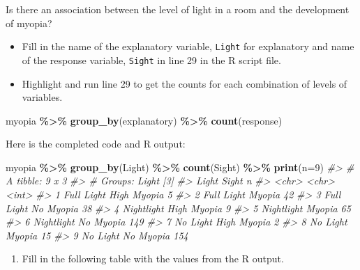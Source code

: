 \documentclass[
]{report}
\newenvironment{Shaded}{\begin{snugshade}}{\end{snugshade}}
\newcommand{\AttributeTok}[1]{\textcolor[rgb]{0.13,0.29,0.53}{#1}}
\newcommand{\CommentTok}[1]{\textcolor[rgb]{0.56,0.35,0.01}{\textit{#1}}}
\newcommand{\DecValTok}[1]{\textcolor[rgb]{0.00,0.00,0.81}{#1}}
\newcommand{\FunctionTok}[1]{\textcolor[rgb]{0.13,0.29,0.53}{\textbf{#1}}}
\newcommand{\NormalTok}[1]{#1}
\newcommand{\SpecialCharTok}[1]{\textcolor[rgb]{0.81,0.36,0.00}{\textbf{#1}}}
\providecommand{\tightlist}{%
  \setlength{\itemsep}{0pt}\setlength{\parskip}{0pt}}
\begin{document}
Is there an association between the level of light in a room and the development of myopia?

\begin{itemize}
\item
  Fill in the name of the explanatory variable, \texttt{Light} for explanatory and name of the response variable, \texttt{Sight} in line 29 in the R script file.
\item
  Highlight and run line 29 to get the counts for each combination of levels of variables.
\end{itemize}

\begin{Shaded}
\begin{Highlighting}[]
\NormalTok{myopia }\SpecialCharTok{\%\textgreater{}\%} \FunctionTok{group\_by}\NormalTok{(explanatory) }\SpecialCharTok{\%\textgreater{}\%} \FunctionTok{count}\NormalTok{(response)}
\end{Highlighting}
\end{Shaded}

Here is the completed code and R output:

\begin{Shaded}
\begin{Highlighting}[]
\NormalTok{myopia }\SpecialCharTok{\%\textgreater{}\%} \FunctionTok{group\_by}\NormalTok{(Light) }\SpecialCharTok{\%\textgreater{}\%} \FunctionTok{count}\NormalTok{(Sight) }\SpecialCharTok{\%\textgreater{}\%} \FunctionTok{print}\NormalTok{(}\AttributeTok{n=}\DecValTok{9}\NormalTok{)}
\CommentTok{\#\textgreater{} \# A tibble: 9 x 3}
\CommentTok{\#\textgreater{} \# Groups:   Light [3]}
\CommentTok{\#\textgreater{}   Light      Sight           n}
\CommentTok{\#\textgreater{}   \textless{}chr\textgreater{}      \textless{}chr\textgreater{}       \textless{}int\textgreater{}}
\CommentTok{\#\textgreater{} 1 Full Light High Myopia     5}
\CommentTok{\#\textgreater{} 2 Full Light Myopia         42}
\CommentTok{\#\textgreater{} 3 Full Light No Myopia      38}
\CommentTok{\#\textgreater{} 4 Nightlight High Myopia     9}
\CommentTok{\#\textgreater{} 5 Nightlight Myopia         65}
\CommentTok{\#\textgreater{} 6 Nightlight No Myopia     149}
\CommentTok{\#\textgreater{} 7 No Light   High Myopia     2}
\CommentTok{\#\textgreater{} 8 No Light   Myopia         15}
\CommentTok{\#\textgreater{} 9 No Light   No Myopia     154}
\end{Highlighting}
\end{Shaded}

\begin{enumerate}
\def\labelenumi{\arabic{enumi}.}
\setcounter{enumi}{3}
\tightlist
\item
  Fill in the following table with the values from the R output.
\end{enumerate}
\end{document}
